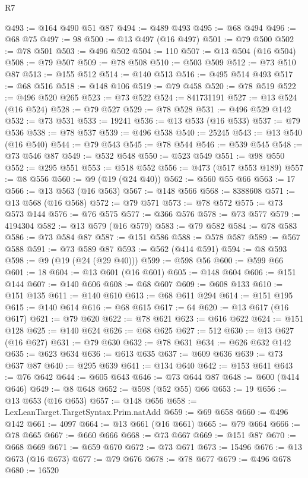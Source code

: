 \begin{lexlean}{R7}
\begin{coremodule}
@493 := @164 @490 @51 @87
@494 := @489 @493
@495 := @68 @494
@496 := @68 @75
@497 := 98
@500 := @13 @497 (@16 @497)
@501 := @79 @500
@502 := @78 @501
@503 := @496 @502
@504 := 110
@507 := @13 @504 (@16 @504)
@508 := @79 @507
@509 := @78 @508
@510 := @503 @509
@512 := @73 @510 @87
@513 := @155 @512
@514 := @140 @513
@516 := @495 @514 @493
@517 := @68 @516
@518 := @148 @106
@519 := @79 @458
@520 := @78 @519
@522 := @496 @520 @265
@523 := @73 @522
@524 := 841731191
@527 := @13 @524 (@16 @524)
@528 := @79 @527
@529 := @78 @528
@531 := @496 @529 @142
@532 := @73 @531
@533 := 19241
@536 := @13 @533 (@16 @533)
@537 := @79 @536
@538 := @78 @537
@539 := @496 @538
@540 := 25245
@543 := @13 @540 (@16 @540)
@544 := @79 @543
@545 := @78 @544
@546 := @539 @545
@548 := @73 @546 @87
@549 := @532 @548
@550 := @523 @549
@551 := @98 @550
@552 := @295 @551
@553 := @518 @552
@556 := @473 (@517 @553 @189)
@557 := @8 @556
@560 := @9 (@19 (@24 @40))
@562 := @560 @55 @66
@563 := 17
@566 := @13 @563 (@16 @563)
@567 := @148 @566
@568 := 8388608
@571 := @13 @568 (@16 @568)
@572 := @79 @571
@573 := @78 @572
@575 := @73 @573 @144
@576 := @76 @575
@577 := @366 @576
@578 := @73 @577
@579 := 4194304
@582 := @13 @579 (@16 @579)
@583 := @79 @582
@584 := @78 @583
@586 := @73 @584 @87
@587 := @151 @586
@588 := @578 @587
@589 := @567 @588
@591 := @73 @589 @87
@593 := @562 (@414 @591)
@594 := @8 @593
@598 := @9 (@19 (@24 (@29 @40)))
@599 := @598 @56
@600 := @599 @66
@601 := 18
@604 := @13 @601 (@16 @601)
@605 := @148 @604
@606 := @151 @144
@607 := @140 @606
@608 := @68 @607
@609 := @608 @133
@610 := @151 @135
@611 := @140 @610
@613 := @68 @611 @294
@614 := @151 @195
@615 := @140 @614
@616 := @68 @615
@617 := 64
@620 := @13 @617 (@16 @617)
@621 := @79 @620
@622 := @78 @621
@623 := @616 @622
@624 := @151 @128
@625 := @140 @624
@626 := @68 @625
@627 := 512
@630 := @13 @627 (@16 @627)
@631 := @79 @630
@632 := @78 @631
@634 := @626 @632 @142
@635 := @623 @634
@636 := @613 @635
@637 := @609 @636
@639 := @73 @637 @87
@640 := @295 @639
@641 := @134 @640
@642 := @153 @641
@643 := @76 @642
@644 := @605 @643
@646 := @73 @644 @87
@648 := @600 (@414 @646)
@649 := @8 @648
@652 := @598 (@52 @55) @66
@653 := 19
@656 := @13 @653 (@16 @653)
@657 := @148 @656
@658 := LexLeanTarget.TargetSyntax.Prim.natAdd
@659 := @69 @658
@660 := @496 @142
@661 := 4097
@664 := @13 @661 (@16 @661)
@665 := @79 @664
@666 := @78 @665
@667 := @660 @666
@668 := @73 @667
@669 := @151 @87
@670 := @668 @669
@671 := @659 @670
@672 := @73 @671
@673 := 15496
@676 := @13 @673 (@16 @673)
@677 := @79 @676
@678 := @78 @677
@679 := @496 @678
@680 := 16520

\end{coremodule}
\end{lexlean}
